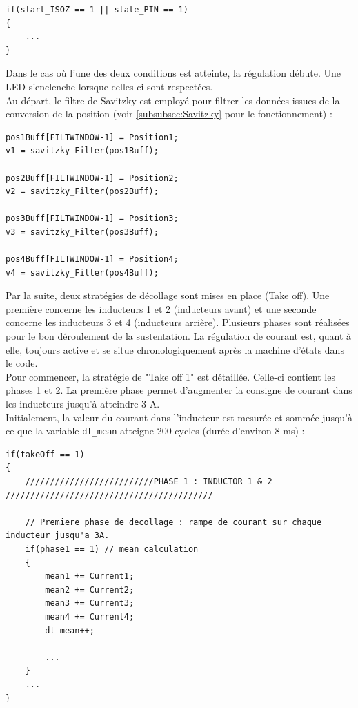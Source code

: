 \begin{verbatim}
if(start_ISOZ == 1 || state_PIN == 1)
{
    ...
}
\end{verbatim}

Dans le cas où l'une des deux conditions est atteinte, la régulation débute. Une LED s'enclenche lorsque celles-ci sont respectées.\\

Au départ, le filtre de Savitzky est employé pour filtrer les données issues de la conversion de la position (voir \ref{subsubsec:Savitzky} pour le fonctionnement) :

\begin{verbatim}
pos1Buff[FILTWINDOW-1] = Position1;
v1 = savitzky_Filter(pos1Buff);

pos2Buff[FILTWINDOW-1] = Position2;
v2 = savitzky_Filter(pos2Buff);

pos3Buff[FILTWINDOW-1] = Position3;
v3 = savitzky_Filter(pos3Buff);

pos4Buff[FILTWINDOW-1] = Position4;
v4 = savitzky_Filter(pos4Buff);
\end{verbatim}

Par la suite, deux stratégies de décollage sont mises en place (Take off). Une première concerne les inducteurs 1 et 2 (inducteurs avant) et une seconde concerne les inducteurs 3 et 4 (inducteurs arrière). Plusieurs phases sont réalisées pour le bon déroulement de la sustentation. La régulation de courant est, quant à elle, toujours active et se situe chronologiquement après la machine d'états dans le code.\\

Pour commencer, la stratégie de "Take off 1" est détaillée. Celle-ci contient les phases 1 et 2.
La première phase permet d'augmenter la consigne de courant dans les inducteurs jusqu'à atteindre 3 A.\\

Initialement, la valeur du courant dans l'inducteur est mesurée et sommée jusqu'à ce que la variable \texttt{dt\_mean} atteigne 200 cycles (durée d'environ 8 ms) :

\begin{verbatim}
if(takeOff == 1)
{
    //////////////////////////PHASE 1 : INDUCTOR 1 & 2 //////////////////////////////////////////

    // Premiere phase de decollage : rampe de courant sur chaque inducteur jusqu'a 3A.
    if(phase1 == 1) // mean calculation
    {
        mean1 += Current1;
        mean2 += Current2;
        mean3 += Current3;
        mean4 += Current4;
        dt_mean++;

        ...
    }
    ...
}
\end{verbatim}

